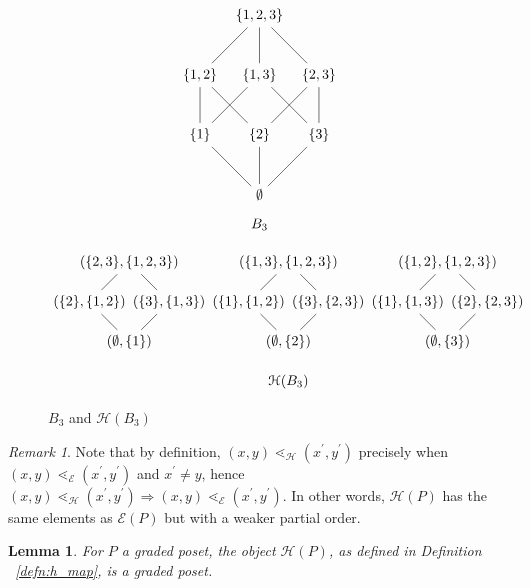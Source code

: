 \documentclass[smallextended, envcountsame, numbook]{svjour3}
\theoremstyle{plain}
\newtheorem{lem}[thm]{Lemma}
\theoremstyle{definition}
\theoremstyle{remark}
\newtheorem{rmk}[thm]{Remark}
\numberwithin{equation}{section}
\begin{document}
\begin{figure}[h!]
\[\begin{tikzpicture}[scale = 1.5]
  \node (0) at (0,0) {$\emptyset$};
  \node (1) at (-1,1) {$\{1\}$};
  \node (2) at (0,1) {$\{2\}$};
  \node (3) at (1,1) {$\{3\}$};
  \node (4) at (-1,2) {$\{1,2\}$};
  \node (5) at (0,2) {$\{1,3\}$};
  \node (6) at (1,2) {$\{2,3\}$};
  \node (7) at (0,3) {$\{1,2,3\}$};
  \draw (0)--(1);
  \draw (0)--(2);
  \draw (0)--(3);
  \draw (1)--(4);
  \draw (1)--(5);
  \draw (2)--(4);
  \draw (2)--(6);
  \draw (3)--(5);
  \draw (3)--(6);
  \draw (4)--(7);
  \draw (5)--(7);
  \draw (6)--(7);
  \node (8) at (0,-.5) {$B_3$};
\end{tikzpicture} \]

\vspace*{0.3in}

\[\begin{tikzpicture}[scale = 1]
  \node (0) at (0,0) {$(\emptyset,\{1\})$};
  \node (1) at (4,0) {$(\emptyset,\{2\})$};
  \node (2) at (8,0) {$(\emptyset,\{3\})$};
  \node (3) at (3,1) {$(\{1\},\{1,2\})$};
  \node (4) at (7,1) {$(\{1\},\{1,3\})$};
  \node (5) at (-1,1) {$(\{2\},\{1,2\})$};
  \node (6) at (9,1) {$(\{2\},\{2,3\})$};
  \node (7) at (1,1) {$(\{3\},\{1,3\})$};
  \node (8) at (5,1) {$(\{3\},\{2,3\})$};
  \node (9) at (8,2) {$(\{1,2\},\{1,2,3\})$};
  \node (10) at (4,2) {$(\{1,3\},\{1,2,3\})$};
  \node (11) at (0,2) {$(\{2,3\},\{1,2,3\})$};
  \draw (0)--(5)--(11)--(7)--(0);
  \draw (1)--(3)--(10)--(8)--(1);
  \draw (2)--(4)--(9)--(6)--(2);
  \node (12) at (4,-1) {$\mathcal{H}(B_3)$};
\end{tikzpicture}\]
\caption{\label{fig:3boolean} $B_3$ and $\mathcal H (B_3)$}
\end{figure}


\begin{rmk}\label{rem:order_containment}
Note that by definition, $(x,y)\lessdot_{\mathcal{H}} (x^\prime,y^\prime)$ precisely when $(x,y)\lessdot_{\mathcal{E}} (x^\prime,y^\prime)$ and $x^\prime\neq y$, hence $(x, y)\lessdot_{\mathcal{H}} (x^\prime, y^\prime) \Rightarrow (x, y)\lessdot_{\mathcal E} (x^\prime, y^\prime)$.  In other words, $\mathcal{H}(P)$ has the same elements as $\mathcal{E}(P)$ but with a weaker partial order.
\end{rmk}


\begin{lem}\label{lem:HP_order}
For $P$ a graded poset, the object $\mathcal{H}(P)$, as defined in Definition ~\ref{defn:h_map}, is a graded poset.
\end{lem}
\end{document}
